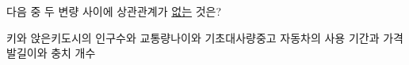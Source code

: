 다음 중 두 변량 사이에 상관관계가 \underline{없는} 것은?
\begin{choicesv}{키와 앉은키}{도시의 인구수와 교통량}{나이와 기초대사량}{중고 자동차의 사용 기간과 가격}{발길이와 충치 개수}\end{choicesv}
